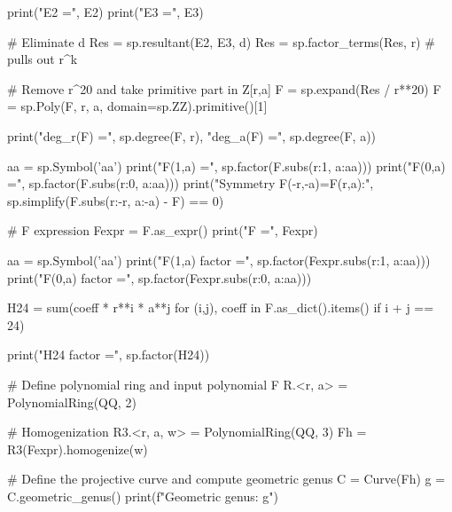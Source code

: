 \documentclass[12pt]{article}
\theoremstyle{remark}
\theoremstyle{definition}
\begin{document}
\begin{code}
print("E2 =", E2)
print("E3 =", E3)

# Eliminate d
Res = sp.resultant(E2, E3, d)
Res = sp.factor_terms(Res, r)     # pulls out r^k

# Remove r^20 and take primitive part in Z[r,a]
F = sp.expand(Res / r**20)
F = sp.Poly(F, r, a, domain=sp.ZZ).primitive()[1]

print("deg_r(F) =", sp.degree(F, r), "deg_a(F) =", sp.degree(F, a))

aa = sp.Symbol('aa')
print("F(1,a) =", sp.factor(F.subs({r:1, a:aa})))
print("F(0,a) =", sp.factor(F.subs({r:0, a:aa})))
print("Symmetry F(-r,-a)=F(r,a):", sp.simplify(F.subs({r:-r, a:-a}) - F) == 0)

# F expression
Fexpr = F.as_expr()
print("F =", Fexpr)

aa = sp.Symbol('aa')
print("F(1,a) factor =", sp.factor(Fexpr.subs({r:1, a:aa})))
print("F(0,a) factor =", sp.factor(Fexpr.subs({r:0, a:aa})))

H24 = sum(coeff * r**i * a**j
          for (i,j), coeff in F.as_dict().items()
          if i + j == 24)

print("H24 factor =", sp.factor(H24))

# Define polynomial ring and input polynomial F
R.<r, a> = PolynomialRing(QQ, 2)

# Homogenization
R3.<r, a, w> = PolynomialRing(QQ, 3)
Fh = R3(Fexpr).homogenize(w)

# Define the projective curve and compute geometric genus
C = Curve(Fh)
g = C.geometric_genus()
print(f"Geometric genus: {g}")
\end{code}
\end{document}
